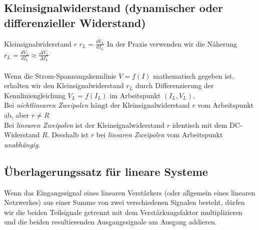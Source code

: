 		\subsection{Kleinsignalwiderstand (dynamischer oder differenzieller
		Widerstand) }
			Kleinsignalwiderstand $r$ \hspace{15mm} $r_L=\frac{dV_L}{dI_L}$ In der Praxis
			verwenden wir die Näherung $r_L=\frac{dV_L}{dI_L}\approx \frac{\Delta
			V_L}{\Delta I_L}$\\ \\
			Wenn die Strom-Spannungskennlinie $V=f(I)$ mathematisch gegeben ist, erhalten
			wir den Kleinsignalwiderstand $r_L$ durch Differenzierung der
			Kennliniengleichung $V_L=f(I_L)$ im Arbeitspunkt $(I_L, V_L)$.\\
			Bei {\it nichtlinearen Zweipolen} hängt der Kleinsignalwiderstand $r$
			vom Arbeitspunkt ab, aber $r\neq R$\\
			Bei {\it linearen Zweipolen} ist der Kleinsignalwiderstand $r$
			identisch mit dem DC-Widerstand $R$. Desshalb ist $r$ bei {\it linearen
			Zweipolen} vom Arbeitspunkt {\it unabhängig}.\\
		
	\subsection{Überlagerungssatz für lineare Systeme }
			Wenn das Eingangssignal eines linearen Verstärkers (oder allgemein eines
			linearen Netzwerkes) aus einer Summe von zwei verschiedenen Signalen besteht,
			dürfen wir die beiden Teilsignale getrennt mit dem Verstärkungsfaktor
			multiplizieren und die beiden resultierenden Ausgangssignale am Ausgang
			addieren.\\
			\hspace*{10mm}
			\\